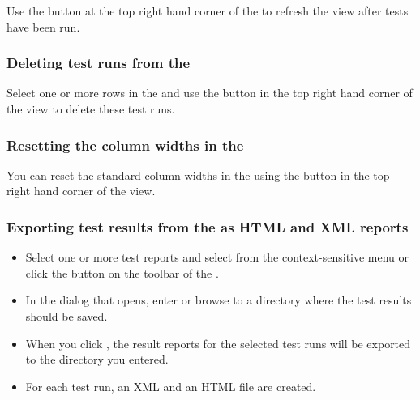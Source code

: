 Use the  button at the top right hand corner of the \gdtestsummaryview{} to refresh the view after tests have been run. 

\subsubsection{Deleting test runs from the \gdtestsummaryview{}}
\label{TestSummaryDelete}
Select one or more rows in the \gdtestsummaryview{} and use the  button in the top right hand corner of the view to delete these test runs. 

\subsubsection{Resetting the column widths in the \gdtestsummaryview}
\label{TestSummaryReset}
You can reset the standard column widths in the \gdtestsummaryview{} using the button in the top right hand corner of the view. 

\subsubsection{Exporting test results from the \gdtestsummaryview{} as HTML and XML reports}
\label{TestSummaryExport}

\begin{itemize}
\item Select one or more test reports and select  from the context-sensitive menu or click the  button on the toolbar of the \gdtestsummaryview{}.
\item In the dialog that opens, enter or browse to a directory where the test results should be saved. 
\item When you click , the result reports for the selected test runs will be exported to the directory you entered.
\item For each test run, an XML and an HTML file are created. 
\end{itemize}


